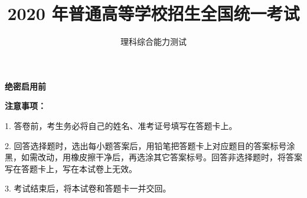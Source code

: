 \documentclass[list,mac,answers]{BHCexam}
\begin{document}
\textbf{绝密启用前} 
\title{2020 年普通高等学校招生全国统一考试}
\subtitle{理科综合能力测试}
\maketitle

\textbf{注意事项：} 
\setlength\parindent{2em}

1. 答卷前，考生务必将自己的姓名、准考证号填写在答题卡上。

2. 回答选择题时，选出每小题答案后，用铅笔把答题卡上对应题目的答案标号涂黑，如需改动，用橡皮擦干净后，再选涂其它答案标号。回答非选择题时，将答案写在答题卡上，写在本试卷上无效。

3. 考试结束后，将本试卷和答题卡一并交回。

\begin{groups}


\begin{questions}[30s]

\end{questions}


\begin{questions}[p]

\end{questions}



\end{groups}
\label{lastpage}
\end{document}
